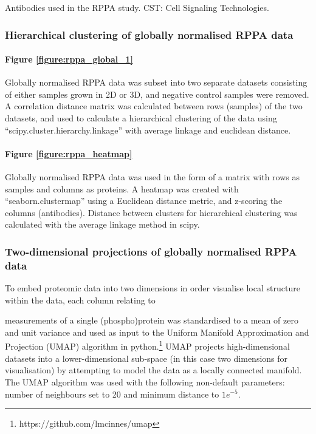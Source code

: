 \documentclass[a4paper,11pt,twoside,openright]{scrbook}
\begin{document}
\begin{table}
    \begin{tiny}
    
    \centering
    \caption[Antibodies used in RPPA study]{
        Antibodies used in the RPPA study. CST: Cell Signaling Technologies.
    }
    \label{table:rppa_antibodies}
    \end{tiny}
\end{table}

\subsubsection{Hierarchical clustering of globally normalised RPPA data}

\paragraph{Figure \ref{figure:rppa_global_1}}
Globally normalised RPPA data was subset into two separate datasets consisting of either samples grown in 2D or 3D, and 
negative control samples were removed.
A correlation distance matrix was calculated between rows (samples) of the two datasets, and used to calculate a 
hierarchical clustering of the data using ``scipy.cluster.hierarchy.linkage'' with average linkage and euclidean 
distance.

\paragraph{Figure \ref{figure:rppa_heatmap}}
Globally normalised RPPA data was used in the form of a matrix with rows as samples and columns as proteins.
A heatmap was created with ``seaborn.clustermap'' using a Euclidean distance metric, and z-scoring the columns 
(antibodies).
Distance between clusters for hierarchical clustering was calculated with the average linkage method in scipy.


\subsubsection{Two-dimensional projections of globally normalised RPPA data}
To embed proteomic data into two dimensions in order visualise local structure within the data, each column relating to 

measurements of a single (phospho)protein was standardised to a mean of zero and unit variance and used as input to the 
Uniform Manifold Approximation and Projection (UMAP) algorithm in python.\footnote{https://github.com/lmcinnes/umap}
UMAP projects high-dimensional datasets into a lower-dimensional sub-space (in this case two dimensions for 
visualisation) by attempting to model the data as a locally connected manifold. \cite{McInnes2018}
The UMAP algorithm was used with the following non-default parameters: number of neighbours set to 20 and minimum 
distance to $1e^{-5}$.
\end{document}
